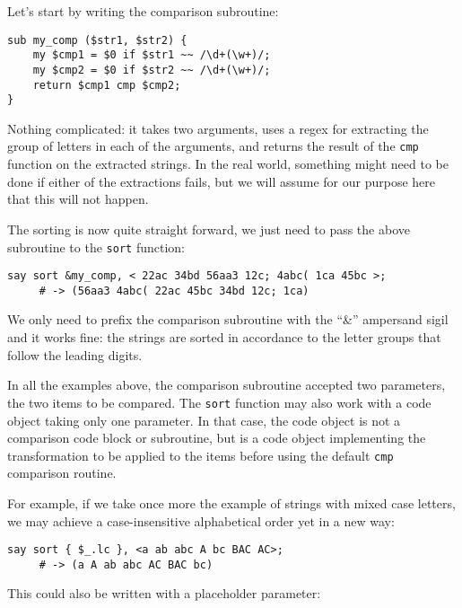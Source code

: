 Let's start by writing the comparison subroutine:


\begin{verbatim}
sub my_comp ($str1, $str2) {
    my $cmp1 = $0 if $str1 ~~ /\d+(\w+)/; 
    my $cmp2 = $0 if $str2 ~~ /\d+(\w+)/; 
    return $cmp1 cmp $cmp2;
}
\end{verbatim}

Nothing complicated: it takes two arguments, uses a regex 
for extracting the group of letters in each of the 
arguments, and returns the result of the {\tt cmp} 
function on the extracted strings. In the real world, something 
might need to be done if either of the extractions fails, but 
we will assume for our purpose here that this will not happen.

The sorting is now quite straight forward, we just need to pass the above subroutine to the {\tt sort} function:

\begin{verbatim}
say sort &my_comp, < 22ac 34bd 56aa3 12c; 4abc( 1ca 45bc >;
     # -> (56aa3 4abc( 22ac 45bc 34bd 12c; 1ca)
\end{verbatim}

We only need to prefix the comparison subroutine with the 
``\&'' ampersand sigil and it works fine: the strings are sorted 
in accordance to the letter groups that follow the leading digits.

In all the examples above, the comparison subroutine 
accepted two parameters, the two items to be compared. 
The {\tt sort} function may also work with a code object 
taking only one parameter. In that case, the code object 
is not a comparison code block or subroutine, but is a 
code object implementing the transformation to be 
applied to the items before using the default {\tt cmp} 
comparison routine. 

For example, if we take once more the example of strings 
with mixed case letters, we may achieve a case-insensitive 
alphabetical order yet in a new way:

\begin{verbatim}
say sort { $_.lc }, <a ab abc A bc BAC AC>;
     # -> (a A ab abc AC BAC bc)
\end{verbatim}

This could also be written with a placeholder parameter:

